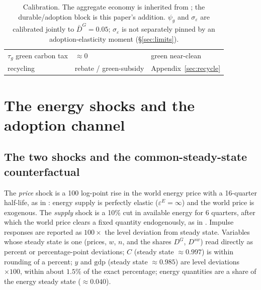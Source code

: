 \documentclass[11pt,a4paper]{article}
\begin{document}
\begin{table}[H]
\begin{tabular}{lll}
$\tau_g$ green carbon tax                  & $\approx 0$   & green near-clean \\
recycling                                  & rebate / green-subsidy & Appendix~\ref{sec:recycle} \\
\bottomrule
\end{tabular}
\caption{Calibration. The aggregate economy is inherited from \citet{ARS2024};
the durable/adoption block is this paper's addition. $\psi_g$ and
$\sigma_\varepsilon$ are calibrated jointly to $\bar D^{G}=0.05$;
$\sigma_\varepsilon$ is not separately pinned by an adoption-elasticity moment
(\S\ref{sec:limits}).}
\label{tab:calibration}
\end{table}

\section{The energy shocks and the adoption channel}
\label{sec:experiments}

\subsection{The two shocks and the common-steady-state counterfactual}
\label{sec:counterfactual}

The \emph{price} shock is a 100 log-point rise in the world energy price with a
16-quarter half-life, as in \citet{ARS2024}: energy supply is perfectly elastic
($\varepsilon^{E}=\infty$) and the world price is exogenous. The \emph{supply}
shock is a 10\% cut in available energy for 6 quarters, after which the world
price clears a fixed quantity endogenously, as in \citet{Bayer2026}. Impulse
responses are reported as $100\times$ the level deviation from steady state.
Variables whose steady state is one (prices, $w$, $n$, and the shares $D^{G}$,
$D^{sw}$) read directly as percent or percentage-point deviations; $C$ (steady
state $\approx0.997$) is within rounding of a percent; $y$ and $\mathrm{gdp}$
(steady state $\approx0.985$) are level deviations $\times100$, within about
$1.5\%$ of the exact percentage; energy quantities are a share of the energy
steady state ($\approx0.040$).
\end{document}
